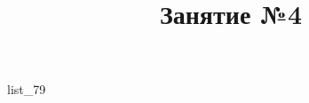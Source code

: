 \documentclass[12pt, a4paper]{article}
\begin{document}
	\title{Занятие №4}
	{list_79}
\end{document}
